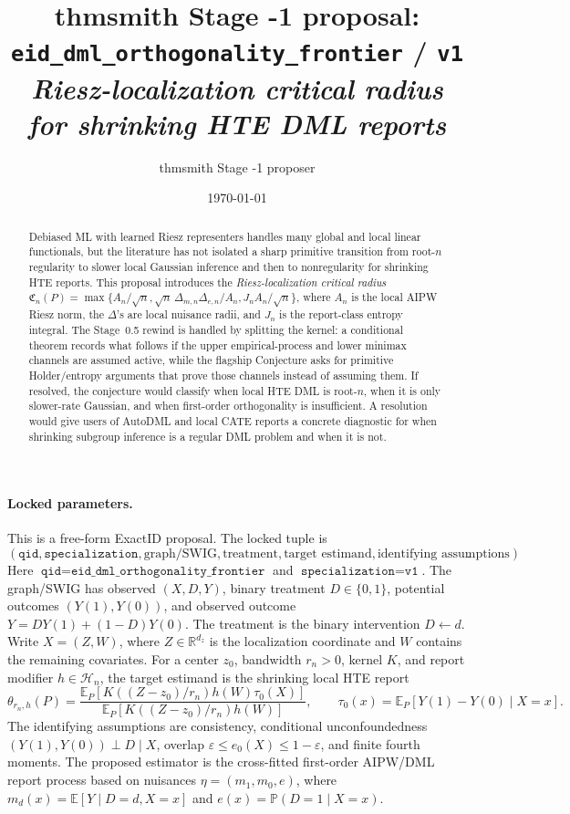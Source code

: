 \documentclass[11pt]{article}
\title{thmsmith Stage -1 proposal: \texttt{eid\_dml\_orthogonality\_frontier} / \texttt{v1}%
  \\ \large\textit{Riesz-localization critical radius for shrinking HTE DML reports}}
\author{thmsmith Stage -1 proposer}
\date{\today}
\newcommand{\E}{\mathbb{E}}
\renewcommand{\Pr}{\mathbb{P}}
\newcommand{\calH}{\mathcal{H}}
\newcommand{\R}{\mathbb{R}}
\theoremstyle{definition}
\theoremstyle{plain}
\theoremstyle{remark}
\begin{document}
\maketitle


\paragraph{Locked parameters.}
This is a free-form ExactID proposal.  The locked tuple is
\[
(\texttt{qid},\texttt{specialization},\text{graph/SWIG},\text{treatment},
\text{target estimand},\text{identifying assumptions}).
\]
Here \(\texttt{qid}=\texttt{eid\_dml\_orthogonality\_frontier}\) and
\(\texttt{specialization}=\texttt{v1}\).  The graph/SWIG has observed
\((X,D,Y)\), binary treatment \(D\in\{0,1\}\), potential outcomes
\((Y(1),Y(0))\), and observed outcome \(Y=DY(1)+(1-D)Y(0)\).  The treatment is
the binary intervention \(D\leftarrow d\).  Write \(X=(Z,W)\), where \(Z\in
\R^{d_z}\) is the localization coordinate and \(W\) contains the remaining
covariates.  For a center \(z_0\), bandwidth \(r_n>0\), kernel \(K\), and
report modifier \(h\in\calH_n\), the target estimand is the shrinking local
HTE report
\[
\theta_{r_n,h}(P)=
\frac{\E_P[K((Z-z_0)/r_n)h(W)\tau_0(X)]}
{\E_P[K((Z-z_0)/r_n)h(W)]},\qquad
\tau_0(x)=\E_P[Y(1)-Y(0)\mid X=x].
\]
The identifying assumptions are consistency, conditional unconfoundedness
\((Y(1),Y(0))\perp D\mid X\), overlap
\(\varepsilon\le e_0(X)\le 1-\varepsilon\), and finite fourth moments.  The
proposed estimator is the cross-fitted first-order AIPW/DML report process
based on nuisances \(\eta=(m_1,m_0,e)\), where
\(m_d(x)=\E[Y\mid D=d,X=x]\) and \(e(x)=\Pr(D=1\mid X=x)\).

\begin{abstract}
Debiased ML with learned Riesz representers handles many global and local
linear functionals, but the literature has not isolated a sharp primitive
transition from root-\(n\) regularity to slower local Gaussian inference and
then to nonregularity for shrinking HTE reports.  This proposal introduces the
\emph{Riesz-localization critical radius}
\(\mathfrak C_n(P)=\max\{A_n/\sqrt n,\sqrt n\,\Delta_{m,n}\Delta_{e,n}/A_n,
J_nA_n/\sqrt n\}\), where \(A_n\) is the local AIPW Riesz norm, the
\(\Delta\)'s are local nuisance radii, and \(J_n\) is the report-class entropy
integral.  The Stage~0.5 rewind is handled by splitting the kernel: a
conditional theorem records what follows if the upper empirical-process and
lower minimax channels are assumed active, while the flagship Conjecture asks
for primitive Holder/entropy arguments that prove those channels instead of
assuming them.  If resolved, the conjecture would classify when local HTE DML
is root-\(n\), when it is only slower-rate Gaussian, and when first-order
orthogonality is insufficient.  A resolution would give users of AutoDML and
local CATE reports a concrete diagnostic for when shrinking subgroup inference
is a regular DML problem and when it is not.
\end{abstract}
\end{document}
